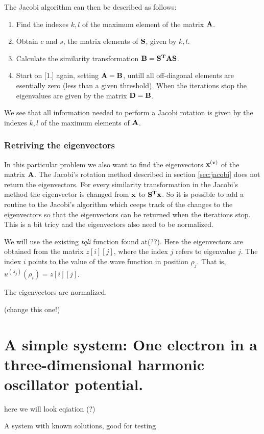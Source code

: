 \documentclass[11pt,a4wide]{article}
\begin{document}
The Jacobi algorithm can then be described as follows: 
\begin{enumerate}
\item Find the indexes $k, l$ of the maximum element of the matrix $\bf A$.
\item Obtain $c$ and $s$, the matrix elements of $\bf S$, given by $k, l$.
\item Calculate the similarity transformation $\bf{B = S^TAS}$.
\item Start on [1.] again, setting $\bf {A = B}$, untill all off-diagonal elements are esentially zero (less than a given threshold). When the iterations stop the eigenvalues are given by the matrix $\bf {D = B}$.
\end{enumerate}

We see that all information needed to perform a Jacobi rotation is given by the indexes $k, l$ of the maximum elements of $\bf A$.

\subsubsection*{Retriving the eigenvectors}
In this particular problem we also want to find the eigenvectors $\bf x^{(v)}$ of the matrix $\bf A$. The Jacobi's rotation method described in section \ref{sec:jacobi} does not return the eigenvectors. For every similarity transformation in the Jacobi's method the eigenvector is changed from $\bf x$ to $\bf{S^Tx}$. So it is possible to add a routine to the Jacobi's algorithm which ceeps track of the changes to the eigenvectors so that the eigenvectors can be returned when the iterations stop. This is a bit tricy and the eigenvectors also need to be normalized.

We will use the existing {\em tqli} function found at(??). Here the eigenvectors are obtained from the matrix $z[i][j]$, where the index $j$ refers to eigenvalue $j$. The index $i$ points to the value of the wave function in position $\rho_j$. That is,  $u^{(\lambda_j)}(\rho_i)=z[i][j]$.   

The eigenvectors are normalized. 

(change this one!)

\section{A simple system: One electron in a three-dimensional harmonic oscillator potential.}
here we will look eqiation (?)

A system with known solutions, good for testing
\end{document}
